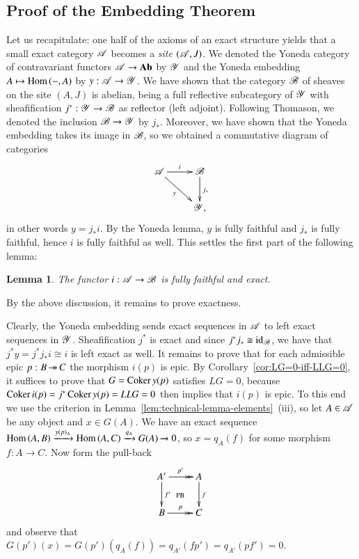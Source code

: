 \documentclass[1p]{elsarticle}
\makeatletter
\renewenvironment{proof}[1][\proofname]{\par
  \pushQED{\qed}%
  \normalfont \topsep6\p@\@plus6\p@\relax
  \trivlist
  \item[\hskip\labelsep
        \scshape
    #1\@addpunct{.}]\ignorespaces
}{%
  \popQED\endtrivlist\@endpefalse
}
\theoremstyle{mythm}
\newtheorem{Lem}[Thm]{Lemma}
\theoremstyle{mydef}
\makeatother
\begin{document}
\subsection{Proof of the Embedding Theorem}

Let us recapitulate: one half of the axioms of an exact structure yields
that a small exact category $\operatorname{\mathscr{A}}$ becomes a \emph{site}
$(\operatorname{\mathscr{A}}, J)$. We denoted the Yoneda category of contravariant functors
$\operatorname{\mathscr{A}} \to \operatorname{\mathbf{Ab}}$ by $\operatorname{\mathscr{Y}}$ and the Yoneda embedding
$A \mapsto \operatorname{Hom}{({-},A)}$ by $y: \operatorname{\mathscr{A}} \to \operatorname{\mathscr{Y}}$. We have shown that
the category $\operatorname{\mathscr{B}}$ of sheaves on the site $(A,J)$ is abelian, being
a full reflective subcategory of $\operatorname{\mathscr{Y}}$ with sheaf\mbox{}ification
$j^{\ast}: \operatorname{\mathscr{Y}} \to \operatorname{\mathscr{B}}$ as reflector (left adjoint). 
Following Thomason, we denoted the inclusion $\operatorname{\mathscr{B}} \to \operatorname{\mathscr{Y}}$ by
$j_{\ast}$. Moreover, we have shown that the Yoneda embedding takes
its image in $\operatorname{\mathscr{B}}$, so we obtained a commutative diagram of
categories
\[
\xymatrix{
  \scrA \ar[r]^-{i} \ar[dr]_-{y} & \scrB \ar[d]^{j_{\ast}} \\
  & \scrY,
}
\]
in other words $y = j_{\ast}i$. By the Yoneda lemma, $y$ is
fully faithful and $j_{\ast}$ is fully faithful, hence $i$ is fully
faithful as well. This settles the first part of the following lemma:

\begin{Lem}
  \label{lem:embedding-exact}
  The functor $i:\operatorname{\mathscr{A}} \to \operatorname{\mathscr{B}}$ is fully faithful and exact.
\end{Lem}
\begin{proof}
  By the above discussion, it remains to prove exactness.
  
  Clearly, the Yoneda embedding sends exact sequences in $\operatorname{\mathscr{A}}$ to
  left exact sequences in $\operatorname{\mathscr{Y}}$. Sheaf\mbox{}ification
  $j^{\ast}$ is exact and since $j^{\ast} j_{\ast} \cong \operatorname{id}_{\operatorname{\mathscr{B}}}$, we have
  that $j^{\ast} y = j^{\ast} j_{\ast} i \cong i$ is left exact as
  well. It remains to prove that for each
  admissible epic $p: B \operatorname{\twoheadrightarrow} C$ the morphism $i(p)$ is epic. 
  By Corollary~\ref{cor:LG=0-iff-LLG=0}, it suffices to prove that
  $G = \operatorname{Coker}{y(p)}$ satisfies $LG = 0$, because 
  $\operatorname{Coker}{i(p)} = j^{\ast}\operatorname{Coker}{y(p)} = LLG = 0$ then implies that
  $i(p)$ is epic. To this end we use the criterion in
  Lemma~\ref{lem:technical-lemma-elements}~(iii), so let
  $A \in \operatorname{\mathscr{A}}$ be any object and $x \in G(A)$. We have an exact
  sequence 
  $\operatorname{Hom}{(A,B)} \xrightarrow{y(p)_{A}} \operatorname{Hom}{(A,C)} \xrightarrow{q_{A}} G(A)
  \xrightarrow{} 0$,
  so $x = q_{A}(f)$ for some morphism $f: A \to C$. Now form the pull-back
  \[
  \xymatrix{
    A' \ar@{->>}[r]^{p'} \ar@{}[dr]|{\text{PB}} \ar[d]^{f'} &
    A \ar[d]^{f} \\
    B \ar@{->>}[r]^{p} & C
  }
  \]
  and observe that $G(p')(x) = G(p')(q_{A}(f)) = q_{A'}(fp') =
  q_{A'}(pf') = 0$.
\end{proof}
\end{document}
